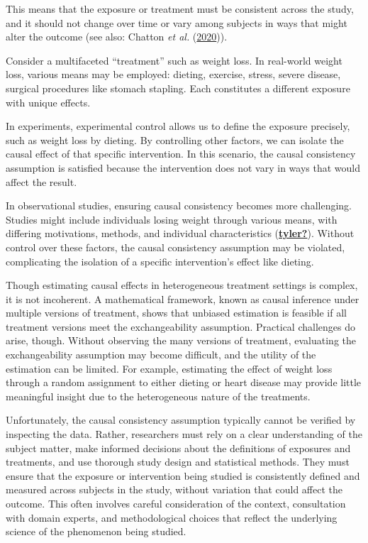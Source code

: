 \documentclass[
  singlecolumn]{article}
\begin{document}
This means that the exposure or treatment must be consistent across the
study, and it should not change over time or vary among subjects in ways
that might alter the outcome (see also: Chatton \emph{et al.}
(\protect\hyperlink{ref-chatton2020}{2020})).

Consider a multifaceted ``treatment'' such as weight loss. In real-world
weight loss, various means may be employed: dieting, exercise, stress,
severe disease, surgical procedures like stomach stapling. Each
constitutes a different exposure with unique effects.

In experiments, experimental control allows us to define the exposure
precisely, such as weight loss by dieting. By controlling other factors,
we can isolate the causal effect of that specific intervention. In this
scenario, the causal consistency assumption is satisfied because the
intervention does not vary in ways that would affect the result.

In observational studies, ensuring causal consistency becomes more
challenging. Studies might include individuals losing weight through
various means, with differing motivations, methods, and individual
characteristics (\protect\hyperlink{ref-tyler}{\textbf{tyler?}}).
Without control over these factors, the causal consistency assumption
may be violated, complicating the isolation of a specific intervention's
effect like dieting.

Though estimating causal effects in heterogeneous treatment settings is
complex, it is not incoherent. A mathematical framework, known as causal
inference under multiple versions of treatment, shows that unbiased
estimation is feasible if all treatment versions meet the
exchangeability assumption. Practical challenges do arise, though.
Without observing the many versions of treatment, evaluating the
exchangeability assumption may become difficult, and the utility of the
estimation can be limited. For example, estimating the effect of weight
loss through a random assignment to either dieting or heart disease may
provide little meaningful insight due to the heterogeneous nature of the
treatments.

Unfortunately, the causal consistency assumption typically cannot be
verified by inspecting the data. Rather, researchers must rely on a
clear understanding of the subject matter, make informed decisions about
the definitions of exposures and treatments, and use thorough study
design and statistical methods. They must ensure that the exposure or
intervention being studied is consistently defined and measured across
subjects in the study, without variation that could affect the outcome.
This often involves careful consideration of the context, consultation
with domain experts, and methodological choices that reflect the
underlying science of the phenomenon being studied.
\end{document}
